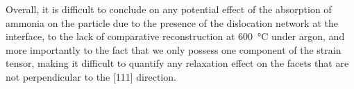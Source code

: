 Overall, it is difficult to conclude on any potential effect of the absorption of ammonia on the particle due to the presence of the dislocation network at the interface, to the lack of comparative reconstruction at \qty{600}{\degreeCelsius} under argon, and more importantly to the fact that we only possess one component of the strain tensor, making it difficult to quantify any relaxation effect on the facets that are not perpendicular to the [111] direction.


